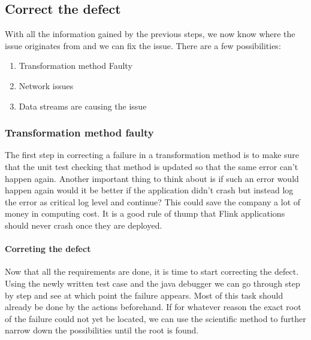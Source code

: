\subsection{Correct the defect}
With all the information gained by the previous steps, we now know where the issue originates from and we can fix the issue. There are a few possibilities:

\begin{enumerate}
  \item[\ref{mdfCorrectTransformation}] Transformation method Faulty
  \item[\ref{mdfCorrectNetwork}] Network issues
  \item[\ref{mdfCorrectDataStreams}] Data streams are causing the issue
\end{enumerate}

\subsubsection{Transformation method faulty}
\label{mdfCorrectTransformation}
The first step in correcting a failure in a transformation method is to make sure that the unit test checking that method is updated so that the same error can't happen again. Another important thing to think about is if such an error would happen again would it be better if the application didn't crash but instead log the error as critical log level and continue? This could save the company a lot of money in computing cost. It is a good rule of thump that Flink applications should never crash once they are deployed.

\paragraph{Correting the defect} Now that all the requirements are done, it is time to start correcting the defect. Using the newly written test case and the java debugger we can go through step by step and see at which point the failure appears. Most of this task should already be done by the actions beforehand. If for whatever reason the exact root of the failure could not yet be located, we can use the scientific method to further narrow down the possibilities until the root is found.

